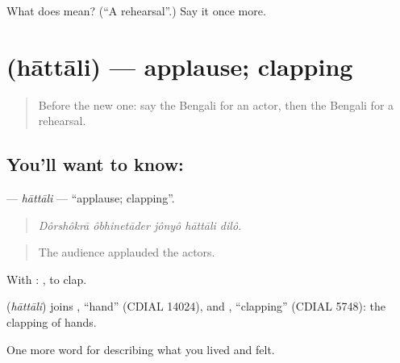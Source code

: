 \begin{tcolorbox}[breakable,colback=teal!4,colframe=teal!35!black,title={Before you move on}]
What does  mean? (\textquotedblleft{}A rehearsal\textquotedblright{}.) Say it once more.
\end{tcolorbox}
\section[\texorpdfstring{\bn{হাততালি} (hāttāli)}{হাততালি (hāttāli)}]{ (hāttāli) — applause; clapping}

\label{lesson:BN-C527-hattali}



\begin{quote}
Before the new one: say the Bengali for an actor, then the Bengali for a rehearsal.
\end{quote}

\subsection*{You'll want to know: }
\textbf{} — \emph{hāttāli} — \textquotedblleft{}applause; clapping\textquotedblright{}.

\begin{quote}
    
\end{quote}

\begin{quote}
\emph{Dôrshôkrā ôbhinetāder jônyô hāttāli dilô.}
\end{quote}

\begin{quote}
The audience applauded the actors.
\end{quote}

With :  , to clap.

\begin{cousinweb}
\textbf{} (\emph{hāttāli}) joins , \textquotedblleft{}hand\textquotedblright{} (CDIAL 14024), and , \textquotedblleft{}clapping\textquotedblright{} (CDIAL 5748): the clapping of hands.
\end{cousinweb}

\begin{grammarlens}[title={What you've built}]
One more word for describing what you lived and felt.
\end{grammarlens}

